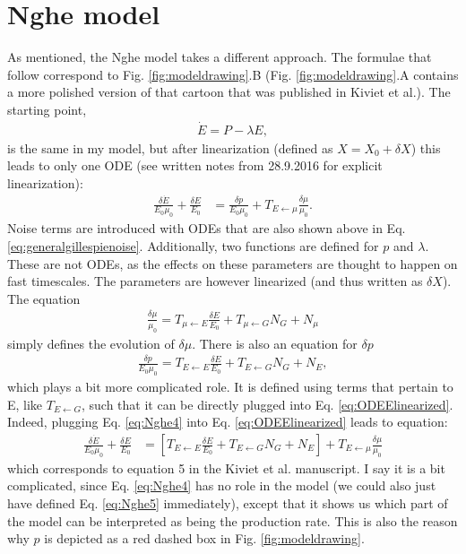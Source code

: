 \documentclass[a4paper,twoside,10pt]{report}
\begin{document}
\section{Nghe model}

As mentioned, the Nghe model takes a different approach. 
The formulae that follow correspond to Fig. \ref{fig:modeldrawing}.B (Fig. \ref{fig:modeldrawing}.A contains a more polished version of that cartoon that was published in Kiviet et al.).
The starting point,
%
\begin{align}
\label{eq:Nghe1}
\dot{E} = P - \lambda E
,
\end{align}
%
is the same in my model, but after linearization (defined as $X=X_0+\delta X$) this leads to only one ODE (see written notes from 28.9.2016 for explicit linearization):
%
\begin{align}
\label{eq:ODEElinearized}
\frac{ \delta{\dot{E}} }{E_0 \mu_0} 
+ \frac{\delta E}{E_0} 
& =
\frac{\delta p}{E_0 \mu_0} + T_{E \leftarrow \mu} \frac{\delta \mu}{\mu_0}
.
\end{align}
%
Noise terms are introduced with ODEs that are also shown above in Eq. \ref{eq:generalgillespienoise}.
 Additionally, two functions are defined for $p$ and $\lambda$. These are not ODEs, as the effects on these parameters are thought to happen on fast timescales. The parameters are however linearized (and thus written as $\delta X$). The equation
%
\begin{align}
\label{eq:Nghe3}
\frac{\delta\mu}{\mu_0} = T_{\mu \leftarrow E} \frac{\delta E}{E_0} + T_{\mu \leftarrow G} N_G + N_\mu
\end{align}
%
simply defines the evolution of $\delta \mu$.
There is also an equation for $\delta p$
%
\begin{align}
\label{eq:Nghe4}
\frac{\delta{p}}{E_0 \mu_0} = T_{E \leftarrow E} \frac{\delta E}{E_0} + T_{E \leftarrow G} N_G + N_E
,
\end{align}
%
which plays a bit more complicated role.
It is defined using terms that pertain to E, like $T_{E \leftarrow G}$, such that it can be directly plugged into Eq. \ref{eq:ODEElinearized}. 
Indeed, plugging Eq. \ref{eq:Nghe4} into Eq. \ref{eq:ODEElinearized} leads to equation:
%
\begin{align}
\label{eq:Nghe5}
\frac{ \delta{\dot{E}} }{E_0 \mu_0} 
+ \frac{\delta E}{E_0} 
& = 
\left[
 T_{E \leftarrow E} \frac{\delta E}{E_0} + T_{E \leftarrow G} N_G + N_E 
 \right]
 + T_{E \leftarrow \mu} \frac{\delta \mu}{\mu_0} 
\end{align}
%
which corresponds to equation 5 in the Kiviet et al. \cite{Kiviet2014} manuscript.
I say it is a bit complicated, since Eq. \ref{eq:Nghe4} has no role in the model (we could also just have defined Eq. \ref{eq:Nghe5} immediately), except that it shows us which part of the model can be interpreted as being the production rate.
This is also the reason why $p$ is depicted as a red dashed box in Fig. \ref{fig:modeldrawing}.
\end{document}
